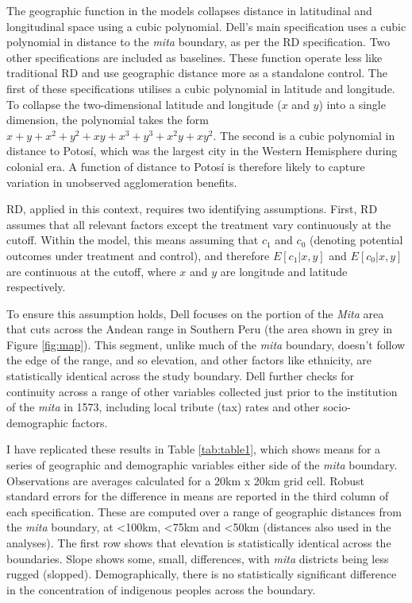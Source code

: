 \documentclass[12pt]{article}
\begin{document}
The geographic function in the models collapses distance in latitudinal and longitudinal space using a cubic polynomial. Dell's main specification uses a cubic polynomial in distance to the \emph{mita} boundary, as per the RD specification. Two other specifications are included as baselines. These function operate less like traditional RD and use geographic distance more as a standalone control. The first of these specifications utilises a cubic polynomial in latitude and longitude. To collapse the two-dimensional latitude and longitude ($x$ and $y$) into a single dimension, the polynomial takes the form $x+y+x^2+y^2+xy+x^3+y^3+x^2y+xy^2$. The second is a cubic polynomial in distance to Potosí, which was the largest city in the Western Hemisphere during colonial era. A function of distance to Potosí is therefore likely to capture variation in unobserved agglomeration benefits.  

RD, applied in this context, requires two identifying assumptions. First, RD assumes that all relevant factors except the treatment vary continuously at the cutoff. Within the model, this means assuming that $c_1$ and $c_0$ (denoting potential outcomes under treatment and control), and therefore $E[c_1 | x, y]$ and $E[c_0 | x, y]$ are continuous at the cutoff, where $x$ and $y$ are longitude and latitude respectively. 

To ensure this assumption holds, Dell focuses on the portion of the \emph{Mita} area that cuts across the Andean range in Southern Peru (the area shown in grey in Figure \ref{fig:map}). This segment, unlike much of the \emph{mita} boundary, doesn't follow the edge of the range, and so elevation, and other factors like ethnicity, are statistically identical across the study boundary. Dell further checks for continuity across a range of other variables collected just prior to the institution of the \emph{mita} in 1573, including local tribute (tax) rates and other socio-demographic factors. 

I have replicated these results in Table \ref{tab:table1}, which shows means for a series of geographic and demographic variables either side of the \emph{mita} boundary. Observations are averages calculated for a 20km x 20km grid cell. Robust standard errors for the difference in means are reported in the third column of each specification. These are computed over a range of geographic distances from the \emph{mita} boundary, at \textless 100km, \textless 75km and \textless 50km (distances also used in the analyses). The first row shows that elevation is statistically identical across the boundaries. Slope shows some, small, differences, with \emph{mita} districts being less rugged (slopped). Demographically, there is no statistically significant difference in the concentration of indigenous peoples across the boundary. 
\end{document}
